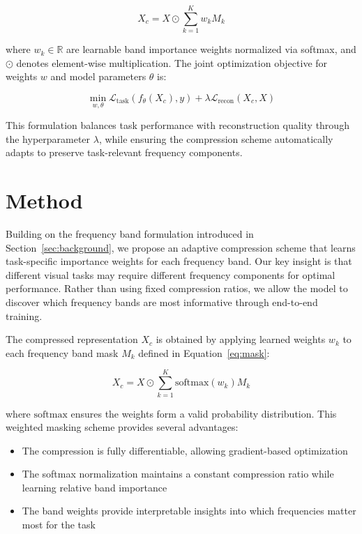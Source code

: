 \documentclass{article} %
\begin{document}
\begin{equation}
\label{eq:compression}
    X_c = X \odot \sum_{k=1}^K w_k M_k
\end{equation}

where $w_k \in \mathbb{R}$ are learnable band importance weights normalized via softmax, and $\odot$ denotes element-wise multiplication. The joint optimization objective for weights $w$ and model parameters $\theta$ is:

\begin{equation}
\label{eq:objective}
    \min_{w,\theta} \mathcal{L}_{\text{task}}(f_\theta(X_c), y) + \lambda \mathcal{L}_{\text{recon}}(X_c, X)
\end{equation}

This formulation balances task performance with reconstruction quality through the hyperparameter $\lambda$, while ensuring the compression scheme automatically adapts to preserve task-relevant frequency components.

\section{Method}
\label{sec:method}

Building on the frequency band formulation introduced in Section~\ref{sec:background}, we propose an adaptive compression scheme that learns task-specific importance weights for each frequency band. Our key insight is that different visual tasks may require different frequency components for optimal performance. Rather than using fixed compression ratios, we allow the model to discover which frequency bands are most informative through end-to-end training.

The compressed representation $X_c$ is obtained by applying learned weights $w_k$ to each frequency band mask $M_k$ defined in Equation~\ref{eq:mask}:

\begin{equation}
\label{eq:weighted_compression}
X_c = X \odot \sum_{k=1}^K \text{softmax}(w_k) M_k
\end{equation}

where $\text{softmax}$ ensures the weights form a valid probability distribution. This weighted masking scheme provides several advantages:

\begin{itemize}
    \item The compression is fully differentiable, allowing gradient-based optimization
    \item The softmax normalization maintains a constant compression ratio while learning relative band importance
    \item The band weights provide interpretable insights into which frequencies matter most for the task
\end{itemize}
\end{document}
